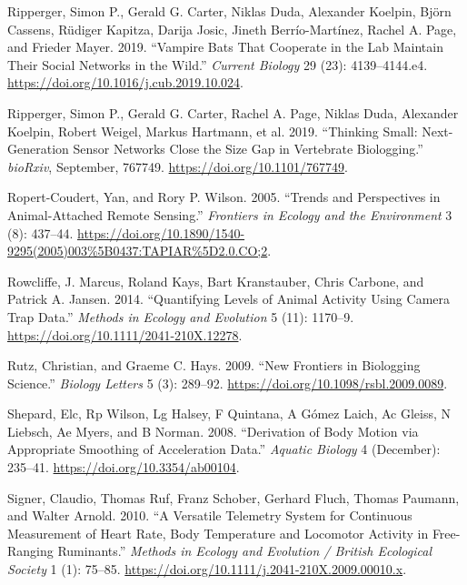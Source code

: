 \documentclass[msc,numbers,hidelinks]{coppe}
\newlength{\cslhangindent}
\newenvironment{cslreferences}%
  {\setlength{\parindent}{0pt}%
  \everypar{\setlength{\hangindent}{\cslhangindent}}\ignorespaces}%
  {\par}
\begin{document}
\begin{cslreferences}
  \leavevmode\hypertarget{ref-rippergerVampireBatsThat2019}{}%
  Ripperger, Simon P., Gerald G. Carter, Niklas Duda, Alexander Koelpin, Björn Cassens, Rüdiger Kapitza, Darija Josic, Jineth Berrío-Martínez, Rachel A. Page, and Frieder Mayer. 2019. ``Vampire Bats That Cooperate in the Lab Maintain Their Social Networks in the Wild.'' \emph{Current Biology} 29 (23): 4139--4144.e4. \url{https://doi.org/10.1016/j.cub.2019.10.024}.

  \leavevmode\hypertarget{ref-rippergerThinkingSmallNextgeneration2019}{}%
  Ripperger, Simon P., Gerald G. Carter, Rachel A. Page, Niklas Duda, Alexander Koelpin, Robert Weigel, Markus Hartmann, et al. 2019. ``Thinking Small: Next-Generation Sensor Networks Close the Size Gap in Vertebrate Biologging.'' \emph{bioRxiv}, September, 767749. \url{https://doi.org/10.1101/767749}.

  \leavevmode\hypertarget{ref-ropert-coudertTrendsPerspectivesAnimalattached2005}{}%
  Ropert-Coudert, Yan, and Rory P. Wilson. 2005. ``Trends and Perspectives in Animal-Attached Remote Sensing.'' \emph{Frontiers in Ecology and the Environment} 3 (8): 437--44. \url{https://doi.org/10.1890/1540-9295(2005)003\%5B0437:TAPIAR\%5D2.0.CO;2}.

  \leavevmode\hypertarget{ref-rowcliffeQuantifyingLevelsAnimal2014}{}%
  Rowcliffe, J. Marcus, Roland Kays, Bart Kranstauber, Chris Carbone, and Patrick A. Jansen. 2014. ``Quantifying Levels of Animal Activity Using Camera Trap Data.'' \emph{Methods in Ecology and Evolution} 5 (11): 1170--9. \url{https://doi.org/10.1111/2041-210X.12278}.

  \leavevmode\hypertarget{ref-rutzNewFrontiersBiologging2009}{}%
  Rutz, Christian, and Graeme C. Hays. 2009. ``New Frontiers in Biologging Science.'' \emph{Biology Letters} 5 (3): 289--92. \url{https://doi.org/10.1098/rsbl.2009.0089}.

  \leavevmode\hypertarget{ref-shepardDerivationBodyMotion2008}{}%
  Shepard, Elc, Rp Wilson, Lg Halsey, F Quintana, A Gómez Laich, Ac Gleiss, N Liebsch, Ae Myers, and B Norman. 2008. ``Derivation of Body Motion via Appropriate Smoothing of Acceleration Data.'' \emph{Aquatic Biology} 4 (December): 235--41. \url{https://doi.org/10.3354/ab00104}.

  \leavevmode\hypertarget{ref-signerVersatileTelemetrySystem2010}{}%
  Signer, Claudio, Thomas Ruf, Franz Schober, Gerhard Fluch, Thomas Paumann, and Walter Arnold. 2010. ``A Versatile Telemetry System for Continuous Measurement of Heart Rate, Body Temperature and Locomotor Activity in Free-Ranging Ruminants.'' \emph{Methods in Ecology and Evolution / British Ecological Society} 1 (1): 75--85. \url{https://doi.org/10.1111/j.2041-210X.2009.00010.x}.


\end{cslreferences}
\end{document}
